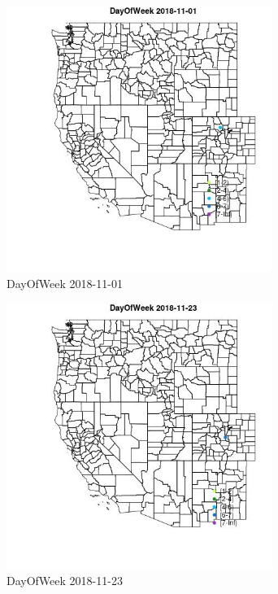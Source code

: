 \begin{figure} 
\centering  
\includegraphics[width=0.77\textwidth]{Code_Outputs/Report_ML_input_PM25_Step4_part_e_de_duplicated_aves_MapObsDayOfWeek2018-11-01.jpg} 
\caption{\label{fig:Report_ML_input_PM25_Step4_part_e_de_duplicated_avesMapObsDayOfWeek2018-11-01}DayOfWeek 2018-11-01} 
\end{figure} 
 

\begin{figure} 
\centering  
\includegraphics[width=0.77\textwidth]{Code_Outputs/Report_ML_input_PM25_Step4_part_e_de_duplicated_aves_MapObsDayOfWeek2018-11-23.jpg} 
\caption{\label{fig:Report_ML_input_PM25_Step4_part_e_de_duplicated_avesMapObsDayOfWeek2018-11-23}DayOfWeek 2018-11-23} 
\end{figure} 
 

